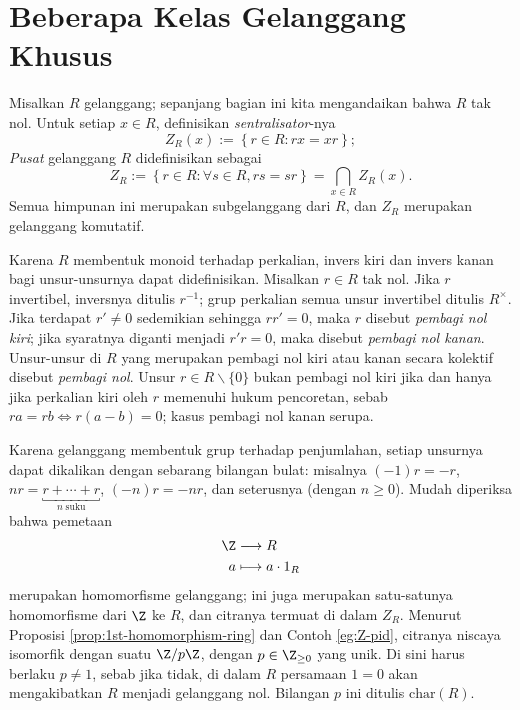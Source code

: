 \section{Beberapa Kelas Gelanggang Khusus}
Misalkan $R$ gelanggang; sepanjang bagian ini kita mengandaikan bahwa $R$ tak nol. Untuk setiap $x \in R$, definisikan \emph{sentralisator}-nya
\[ Z_R(x) := \left\{ r \in R : rx=xr \right\}; \]
\emph{Pusat} gelanggang $R$ didefinisikan sebagai
\[ Z_R := \left\{r \in R : \forall s \in R, rs=sr \right\} = \bigcap_{x \in R} Z_R(x). \]
Semua himpunan ini merupakan subgelanggang dari $R$, dan $Z_R$ merupakan gelanggang komutatif.

Karena $R$ membentuk monoid terhadap perkalian, invers kiri dan invers kanan bagi unsur-unsurnya dapat didefinisikan. Misalkan $r \in R$ tak nol. Jika $r$ invertibel, inversnya ditulis $r^{-1}$; grup perkalian semua unsur invertibel ditulis $R^\times$. Jika terdapat $r' \neq 0$ sedemikian sehingga $rr'=0$, maka $r$ disebut \emph{pembagi nol kiri}; jika syaratnya diganti menjadi $r'r=0$, maka disebut \emph{pembagi nol kanan}. Unsur-unsur di $R$ yang merupakan pembagi nol kiri atau kanan secara kolektif disebut \emph{pembagi nol}. Unsur $r \in R \smallsetminus \{0\}$ bukan pembagi nol kiri jika dan hanya jika perkalian kiri oleh $r$ memenuhi hukum pencoretan, sebab $ra=rb \iff r(a-b)=0$; kasus pembagi nol kanan serupa.

Karena gelanggang membentuk grup terhadap penjumlahan, setiap unsurnya dapat dikalikan dengan sebarang bilangan bulat: misalnya $(-1)r = -r$, $nr = \underbracket{r + \cdots + r}_{n\; \text{suku}}$, $(-n)r = -nr$, dan seterusnya (dengan $n \geq 0$). Mudah diperiksa bahwa pemetaan
\begin{equation}\label{eqn:ring-struct-morphism}\begin{aligned}
	\Z & \longrightarrow R \\
	a & \longmapsto a \cdot 1_R
\end{aligned}\end{equation}
merupakan homomorfisme gelanggang; ini juga merupakan satu-satunya homomorfisme dari $\Z$ ke $R$, dan citranya termuat di dalam $Z_R$. Menurut Proposisi \ref{prop:1st-homomorphism-ring} dan Contoh \ref{eg:Z-pid}, citranya niscaya isomorfik dengan suatu $\Z/p\Z$, dengan $p \in \Z_{\geq 0}$ yang unik. Di sini harus berlaku $p \neq 1$, sebab jika tidak, di dalam $R$ persamaan $1=0$ akan mengakibatkan $R$ menjadi gelanggang nol. Bilangan $p$ ini ditulis $\text{char}(R)$.

